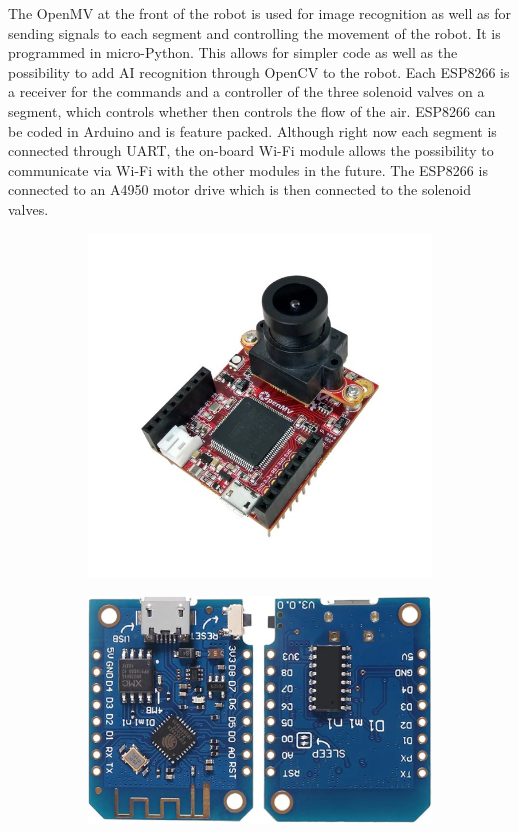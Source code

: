 \documentclass[twoside]{article}
\begin{document}
The OpenMV at the front of the robot is used for image recognition as well as for sending signals to each segment and controlling the movement of the robot. It is programmed in micro-Python. This allows for simpler code as well as the possibility to add AI recognition through OpenCV to the robot. Each ESP8266 is a receiver for the commands and a controller of the three solenoid valves on a segment, which controls whether then controls the flow of the air. ESP8266 can be coded in Arduino and is feature packed. Although right now each segment is connected through UART, the on-board Wi-Fi module allows the possibility to communicate via Wi-Fi with the other modules in the future. The ESP8266 is connected to an A4950 motor drive which is then connected to the solenoid valves. 

\begin{figure}[H]
	\centering
	\begin{subfigure}[b]{0.33\linewidth}
		\centering
		\includegraphics[width=\textwidth]{OpenMV}
	\end{subfigure}%
	\begin{subfigure}[b]{0.33\linewidth}
		\centering		
		\includegraphics[width=\textwidth]{ESP8266}

\end{subfigure}
\end{figure}
\end{document}
